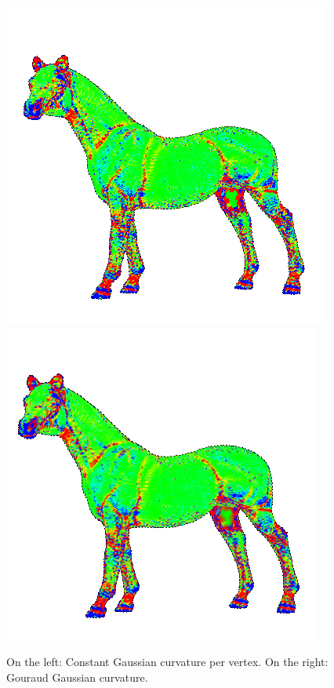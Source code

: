 \begin{figure}[H]
    \endminipage\hfill
    \centering
    \includegraphics[scale=0.9]{images/gc-horse.png}
    \endminipage\hfill
    \centering
    \includegraphics[scale=0.9]{images/gci-horse.png}
    \endminipage
    \caption{On the left: Constant Gaussian curvature per vertex. On the right: Gouraud Gaussian curvature.}
    \label{fig:comparison-gc-gci}
\end{figure}

